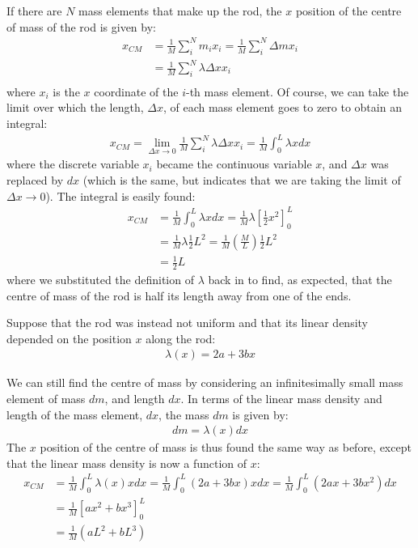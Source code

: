 If there are $N$ mass elements that make up the rod, the $x$ position of the centre of mass of the rod is given by:
\begin{align*}
x_{CM} &= \frac{1}{M}\sum_i^N m_i x_i = \frac{1}{M}\sum_i^N \Delta m x_i \\
&=\frac{1}{M}\sum_i^N \lambda \Delta x x_i\\
\end{align*}
where $x_i$ is the $x$ coordinate of the $i$-th mass element. Of course, we can take the limit over which the length, $\Delta x$, of each mass element goes to zero to obtain an integral:
\begin{align*}
x_{CM} = \lim_{\Delta x \to 0} \frac{1}{M}\sum_i^N \lambda \Delta x x_i = \frac{1}{M} \int_0^L \lambda x dx
\end{align*} 
where the discrete variable $x_i$ became the continuous variable $x$, and $\Delta x$ was replaced by $dx$ (which is the same, but indicates that we are taking the limit of $\Delta x \to 0$). The integral is easily found:
\begin{align*}
x_{CM} &= \frac{1}{M} \int_0^L \lambda x dx = \frac{1}{M}\lambda \left[ \frac{1}{2} x^2\right]_0^L\\
&=\frac{1}{M}\lambda \frac{1}{2} L^2 = \frac{1}{M}\left( \frac{M}{L}\right) \frac{1}{2} L^2\\
&=\frac{1}{2}L
\end{align*}
where we substituted the definition of $\lambda$ back in to find, as expected, that the centre of mass of the rod is half its length away from one of the ends.

Suppose that the rod was instead not uniform and that its linear density depended on the position $x$ along the rod:
\begin{align*}
\lambda(x) = 2a + 3bx
\end{align*}

We can still find the centre of mass by considering an infinitesimally small mass element of mass $dm$, and length $dx$. In terms of the linear mass density and length of the mass element, $dx$, the mass $dm$ is given by:
\begin{align*}
dm = \lambda(x) dx
\end{align*}
The $x$ position of the centre of mass is thus found the same way as before, except that the linear mass density is now a function of $x$:
\begin{align*}
x_{CM} &= \frac{1}{M} \int_0^L \lambda(x) x dx =\frac{1}{M} \int_0^L (2a + 3bx) x dx=\frac{1}{M} \int_0^L (2ax + 3bx^2) dx\\
&=\frac{1}{M}  \left[  ax^2 + bx^3  \right]_0^L\\
&=\frac{1}{M} (aL^2 + bL^3 )
\end{align*}


